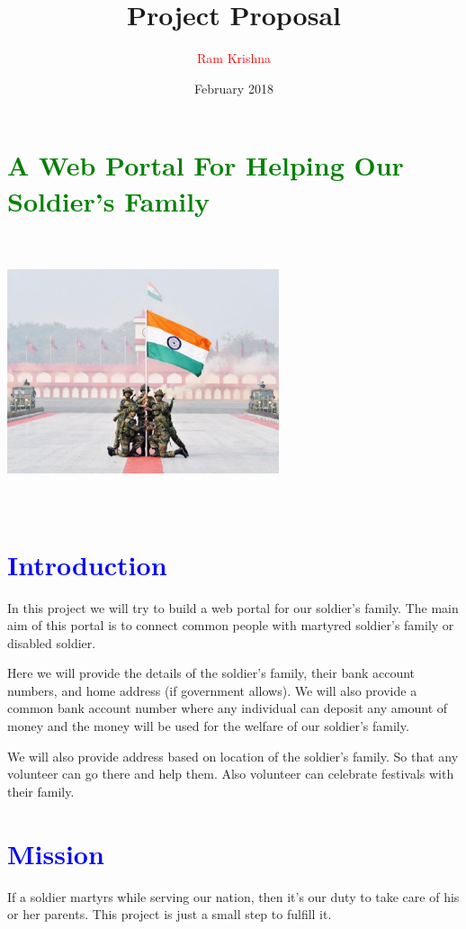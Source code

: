 \documentclass[17pt, journal]{IEEEtran}
\title{{\huge Project Proposal}}
\author{\textcolor{red}{\Large Ram Krishna}}
\affil{2016csb1053}
\date{February 2018}
\begin{document}
\maketitle

\section*{\centering\textcolor{green}{\Large A Web Portal For Helping Our Soldier's Family}}
\begin{center}
   \includegraphics[height=8cm,width=8cm]{img}
\end{center}
\newpage
\tableofcontents
\newpage
\section{\textcolor{blue}{\Large Introduction}}
\Large In this project we will try to build a web portal for our soldier's family. The main aim of this portal is to connect common people with martyred soldier's family or disabled soldier.

Here we will provide the details of the soldier's family, their bank account numbers, and home address (if government allows). We will also provide a common bank account number where any individual can deposit any amount of money and the money will be used for the welfare of our soldier's family. 

We will also provide address based on location of the soldier's family. So that any volunteer can go there and help them. Also volunteer can celebrate festivals with their family.

\section{\textcolor{blue}{\Large Mission}}
\Large If a soldier martyrs while serving our nation, then it's our duty to take care of his or her parents. This project is just a small step to fulfill it.
\end{document}
